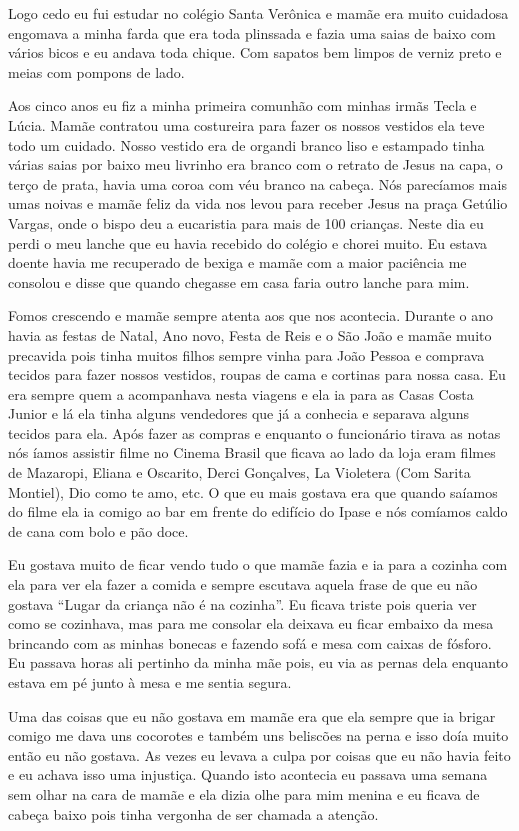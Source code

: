 \documentclass[
  brazil,
  a6paper,
  oneside,
  landscape,
  14pt]{scrbook}
\begin{document}
Logo cedo eu fui estudar no colégio Santa Verônica e mamãe era muito
cuidadosa engomava a minha farda que era toda plinssada e fazia uma
saias de baixo com vários bicos e eu andava toda chique. Com sapatos bem
limpos de verniz preto e meias com pompons de lado.

Aos cinco anos eu fiz a minha primeira comunhão com minhas irmãs Tecla e
Lúcia. Mamãe contratou uma costureira para fazer os nossos vestidos ela
teve todo um cuidado. Nosso vestido era de organdi branco liso e
estampado tinha várias saias por baixo meu livrinho era branco com o
retrato de Jesus na capa, o terço de prata, havia uma coroa com véu
branco na cabeça. Nós parecíamos mais umas noivas e mamãe feliz da vida
nos levou para receber Jesus na praça Getúlio Vargas, onde o bispo deu a
eucaristia para mais de 100 crianças. Neste dia eu perdi o meu lanche
que eu havia recebido do colégio e chorei muito. Eu estava doente havia
me recuperado de bexiga e mamãe com a maior paciência me consolou e
disse que quando chegasse em casa faria outro lanche para mim.

Fomos crescendo e mamãe sempre atenta aos que nos acontecia. Durante o
ano havia as festas de Natal, Ano novo, Festa de Reis e o São João e
mamãe muito precavida pois tinha muitos filhos sempre vinha para João
Pessoa e comprava tecidos para fazer nossos vestidos, roupas de cama e
cortinas para nossa casa. Eu era sempre quem a acompanhava nesta viagens
e ela ia para as Casas Costa Junior e lá ela tinha alguns vendedores que
já a conhecia e separava alguns tecidos para ela. Após fazer as compras
e enquanto o funcionário tirava as notas nós íamos assistir filme no
Cinema Brasil que ficava ao lado da loja eram filmes de Mazaropi, Eliana
e Oscarito, Derci Gonçalves, La Violetera (Com Sarita Montiel), Dio como
te amo, etc. O que eu mais gostava era que quando saíamos do filme ela
ia comigo ao bar em frente do edifício do Ipase e nós comíamos caldo de
cana com bolo e pão doce.

Eu gostava muito de ficar vendo tudo o que mamãe fazia e ia para a
cozinha com ela para ver ela fazer a comida e sempre escutava aquela
frase de que eu não gostava ``Lugar da criança não é na cozinha''. Eu
ficava triste pois queria ver como se cozinhava, mas para me consolar
ela deixava eu ficar embaixo da mesa brincando com as minhas bonecas e
fazendo sofá e mesa com caixas de fósforo. Eu passava horas ali pertinho
da minha mãe pois, eu via as pernas dela enquanto estava em pé junto à
mesa e me sentia segura.

Uma das coisas que eu não gostava em mamãe era que ela sempre que ia
brigar comigo me dava uns cocorotes e também uns beliscões na perna e
isso doía muito então eu não gostava. As vezes eu levava a culpa por
coisas que eu não havia feito e eu achava isso uma injustiça. Quando
isto acontecia eu passava uma semana sem olhar na cara de mamãe e ela
dizia olhe para mim menina e eu ficava de cabeça baixo pois tinha
vergonha de ser chamada a atenção.
\end{document}
